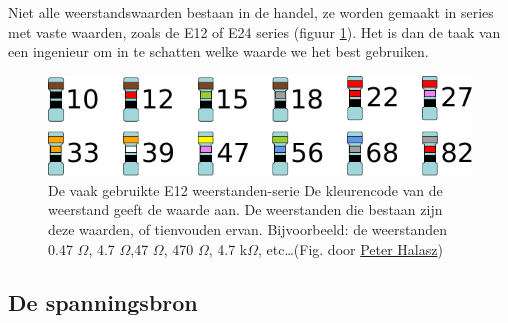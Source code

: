 \documentclass{article}
\begin{document}
			Niet alle weerstandswaarden bestaan in de handel, ze worden gemaakt in series met vaste waarden, zoals de E12 of E24 series (figuur \ref{fig:e12}). Het is dan de taak van een ingenieur om in te schatten welke waarde we het best gebruiken. 

			\begin{figure}[htbp]
				\centering
				\includegraphics[scale=0.8]{e12}
				\caption{
				De vaak gebruikte E12 weerstanden-serie
				De kleurencode van de weerstand geeft de waarde aan. De weerstanden die bestaan zijn deze waarden, of tienvouden ervan. Bijvoorbeeld: de weerstanden 0.47 $\Omega$,  4.7 $\Omega$,47 $\Omega$, 470 $\Omega$, 4.7 k$\Omega$, etc\ldots (Fig. door \href{https://en.wikipedia.org/wiki/User:Pengo}{Peter Halasz})
				} 
				\label{fig:e12}
			\end{figure}

		\subsection{De spanningsbron}
\end{document}
